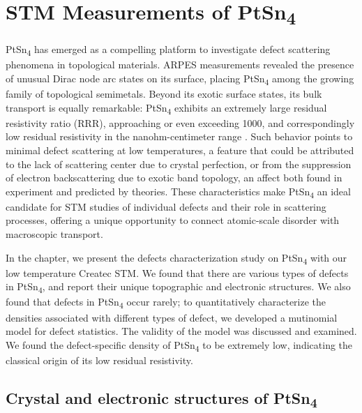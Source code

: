 \chapter{STM Measurements of PtSn\textsubscript{4}}
PtSn\textsubscript{4} has emerged as a compelling platform to investigate defect scattering phenomena in topological materials. ARPES measurements revealed the presence of unusual Dirac node arc states on its surface, placing PtSn\textsubscript{4} among the growing family of topological semimetals\cite{wuDiracNodeArcs2016}. Beyond its exotic surface states, its bulk transport is equally remarkable: PtSn\textsubscript{4} exhibits an extremely large residual resistivity ratio (RRR), approaching or even exceeding 1000, and correspondingly low residual resistivity in the nanohm-centimeter range \cite{munMagneticFieldEffects2012}\cite{perevalovaFeaturesElectronicTransport2022}\cite{diazSemiclassicalOriginExtreme2024}. Such behavior points to minimal defect scattering at low temperatures, a feature that could be attributed to the lack of scattering center due to crystal perfection, or from the suppression of electron backscattering due to exotic band topology, an affect both found in experiment and predicted by theories\cite{roushanTopologicalSurfaceStates2009}\cite{kimRobustProtectionBackscattering2014}\cite{ivanovAbsenceBackscatteringFermiarc2024}. These characteristics make PtSn\textsubscript{4} an ideal candidate for \ac{STM} studies of individual defects and their role in scattering processes, offering a unique opportunity to connect atomic-scale disorder with macroscopic transport.

In the chapter, we present the defects characterization study on PtSn\textsubscript{4} with our low temperature Createc \ac{STM}. We found that there are various types of defects in PtSn\textsubscript{4}, and report their unique topographic and electronic structures. We also found that defects in PtSn\textsubscript{4} occur rarely; to quantitatively characterize the densities associated with different types of defect, we developed a mutinomial model for defect statistics. The validity of the model was discussed and examined. We found the defect-specific density of PtSn\textsubscript{4} to be extremely low, indicating the classical origin of its low residual resistivity. 

\section{Crystal and electronic structures of PtSn\textsubscript{4}}


